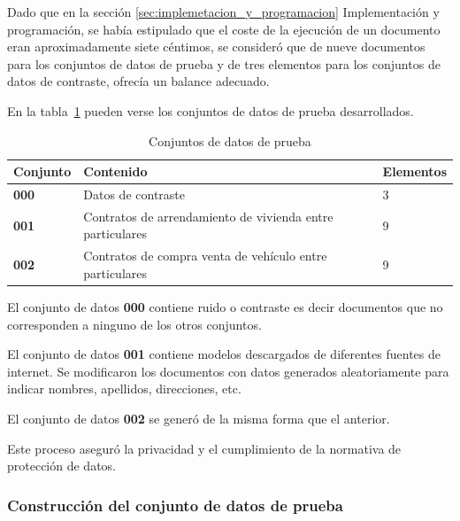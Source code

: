 Dado que en la sección \ref{sec:implemetacion_y_programacion} Implementación y programación, se había estipulado
que el coste de la ejecución de un documento eran aproximadamente siete céntimos, se consideró que de nueve documentos
para los conjuntos de datos de prueba y de tres elementos para los conjuntos de datos de contraste, ofrecía un
balance adecuado.

En la tabla~\ref{tab:data_sets} pueden verse los conjuntos de datos de prueba desarrollados.

\begin{table}[h]
    \renewcommand{\arraystretch}{1.5}
    \setlength{\tabcolsep}{10pt}
    \begin{tabular}{>{\bfseries}p{} p{} p{}}
        \toprule
        \textbf{Conjunto} & \textbf{Contenido}                                        & \textbf{Elementos} \\
        \midrule
        \textbf{000}      & Datos de contraste                                        & 3                  \\
        \textbf{001}      & Contratos de arrendamiento de vivienda entre particulares & 9                  \\
        \textbf{002}      & Contratos de compra venta de vehículo entre particulares  & 9                  \\
        \bottomrule
    \end{tabular}
    \caption{Conjuntos de datos de prueba}
    \label{tab:data_sets}
\end{table}

El conjunto de datos \textbf{000} contiene ruido o contraste es decir documentos que no corresponden a ninguno de los
otros conjuntos.

El conjunto de datos \textbf{001} contiene modelos descargados de diferentes fuentes de internet.
Se modificaron los documentos con datos generados aleatoriamente para indicar nombres, apellidos, direcciones, etc.

El conjunto de datos \textbf{002} se generó de la misma forma que el anterior.

Este proceso aseguró la privacidad y el cumplimiento de la normativa de protección de datos.

\subsubsection{Construcción del conjunto de datos de prueba}

